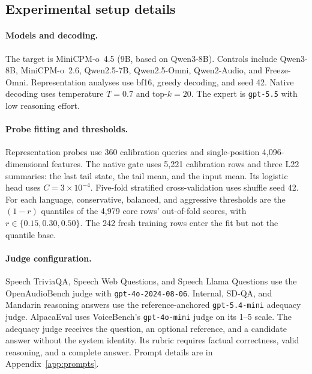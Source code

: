\subsection{Experimental setup details}
\label{app:setup-details}

\paragraph{Models and decoding.}
The target is MiniCPM-o~4.5 (9B, based on Qwen3-8B). Controls include
Qwen3-8B, MiniCPM-o~2.6, Qwen2.5-7B, Qwen2.5-Omni, Qwen2-Audio, and
Freeze-Omni. Representation analyses use bf16, greedy decoding, and seed 42.
Native decoding uses temperature $T=0.7$ and top-$k=20$. The expert is
\texttt{gpt-5.5} with low reasoning effort.

\paragraph{Probe fitting and thresholds.}
Representation probes use 360 calibration queries and single-position
4,096-dimensional features. The native gate uses 5,221 calibration rows
and three L22 summaries: the last tail state, the tail mean, and the
input mean. Its logistic head uses $C=3\times10^{-4}$.
Five-fold stratified cross-validation uses shuffle seed 42.
For each language, conservative, balanced, and aggressive thresholds
are the $(1-r)$ quantiles of the 4,979 core rows' out-of-fold scores,
with $r\in\{0.15,0.30,0.50\}$. The 242 fresh training rows enter
the fit but not the quantile base.

\paragraph{Judge configuration.}
Speech TriviaQA, Speech Web Questions, and Speech Llama Questions use
the OpenAudioBench judge with \texttt{gpt-4o-2024-08-06}. Internal,
SD-QA, and Mandarin reasoning answers use the reference-anchored
\texttt{gpt-5.4-mini} adequacy judge. AlpacaEval uses VoiceBench's
\texttt{gpt-4o-mini} judge on its 1--5 scale. The adequacy judge
receives the question, an optional reference, and a candidate answer
without the system identity. Its rubric requires factual correctness,
valid reasoning, and a complete answer. Prompt details are in
Appendix~\ref{app:prompts}.
